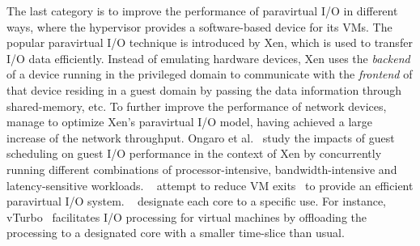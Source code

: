  The last category is to improve the performance of paravirtual I/O in different ways, where the hypervisor provides a software-based device for its VMs.
The popular paravirtual I/O technique is introduced by Xen, which is used to transfer I/O data efficiently. Instead of emulating hardware devices, Xen uses the \emph{backend} of a device running in the privileged domain to communicate with the \emph{frontend} of that device residing in a guest domain by passing the data information through shared-memory, etc. To further improve the performance of network devices, ~\cite{menon2006optimizing,4734994,santos2008bridging} manage to optimize Xen's paravirtual I/O model, having achieved a large increase of the network throughput. Ongaro et al.~\cite{ongaro2008scheduling} study the impacts of guest scheduling on guest I/O performance in the context of Xen by concurrently running different combinations of processor-intensive, bandwidth-intensive and latency-sensitive workloads. ~\cite{gordon2012towards,har2013efficient} attempt to reduce VM exits~\cite{adams2006comparison} to provide an efficient paravirtual I/O system. ~\cite{liao2008software,liu2009virtualization,shalev2010isostack,landau2011splitx,xu2013vturbo} designate each core to a specific use. For instance, vTurbo~\cite{xu2013vturbo} facilitates I/O processing for virtual machines by offloading the processing to a designated core with a smaller time-slice than usual. 



